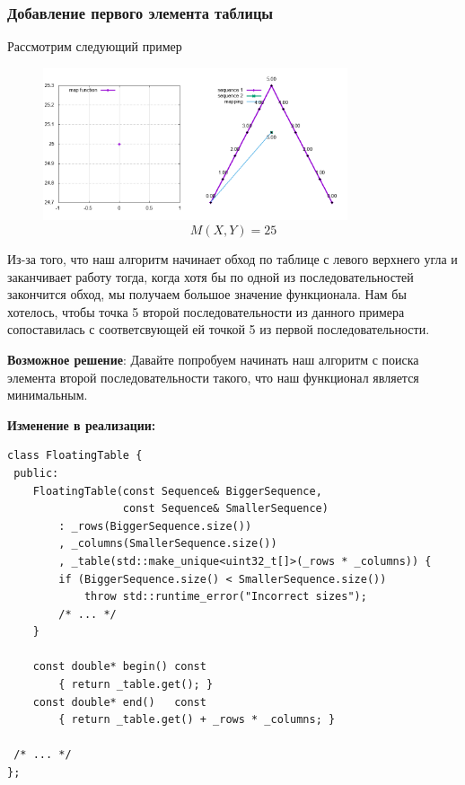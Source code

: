 \documentclass[12pt]{article}
\begin{document}
\newpage
\subsubsection{Добавление первого элемента таблицы}
    Рассмотрим следующий пример

    \begin{figure}[h]
        \centering
        \includegraphics[scale=1.2, width=0.8\textwidth, height=0.4\textwidth]{problem3}
        $$M(X, Y) = 25$$
    \end{figure}

    Из-за того, что наш алгоритм начинает обход по таблице с левого верхнего угла и заканчивает работу
    тогда, когда хотя бы по одной из последовательностей закончится обход, мы получаем большое значение функционала.
    Нам бы хотелось, чтобы точка 5 второй последовательности из данного примера сопоставилась с соответсвующей
    ей точкой 5 из первой последовательности.

    \textbf{Возможное решение}: Давайте попробуем начинать наш алгоритм с поиска элемента второй
    последовательности такого, что наш функционал является минимальным.

    \textbf{Изменение в реализации:}
    \begin{lstlisting}
class FloatingTable {
 public:
    FloatingTable(const Sequence& BiggerSequence,
                  const Sequence& SmallerSequence)
        : _rows(BiggerSequence.size())
        , _columns(SmallerSequence.size())
        , _table(std::make_unique<uint32_t[]>(_rows * _columns)) {
        if (BiggerSequence.size() < SmallerSequence.size())
            throw std::runtime_error("Incorrect sizes");
        /* ... */
    }

    const double* begin() const
        { return _table.get(); }
    const double* end()   const
        { return _table.get() + _rows * _columns; }

 /* ... */
};
    \end{lstlisting}
\end{document}
